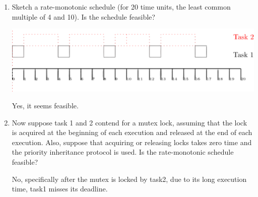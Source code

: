 \documentclass[12pt]{article}
\begin{document}
\begin{enumerate}
	\item 
	Sketch a rate-monotonic schedule (for 20 time units, the least common multiple of 4 and 10). Is the schedule feasible?
	\begin{qsolve}
		\begin{center}
			\includegraphics*[width=0.7\linewidth]{images/Q4/a.png}
		\end{center}
		Yes, it seems feasible.
	\end{qsolve}
	
	
	
	
	\item 
	Now suppose task 1 and 2 contend for a mutex lock, assuming that the lock
	is acquired at the beginning of each execution and released at the end of each
	execution. Also, suppose that acquiring or releasing locks takes zero time
	and the priority inheritance protocol is used. Is the rate-monotonic schedule
	feasible?
	\begin{qsolve}
		No, specifically after the mutex is locked by task2, due to its long execution time, task1 misses its deadline.
	\end{qsolve}
	
	
	

\end{enumerate}
\end{document}
